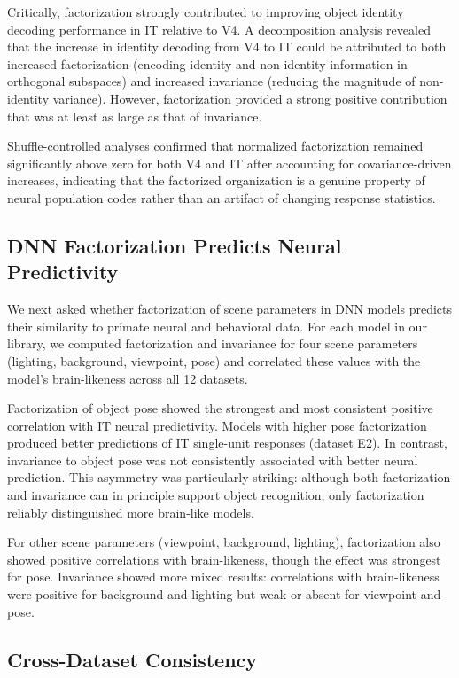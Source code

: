 \documentclass[11pt]{article}
\begin{document}
Critically, factorization strongly contributed to improving object identity decoding performance in IT relative to V4. A decomposition analysis revealed that the increase in identity decoding from V4 to IT could be attributed to both increased factorization (encoding identity and non-identity information in orthogonal subspaces) and increased invariance (reducing the magnitude of non-identity variance). However, factorization provided a strong positive contribution that was at least as large as that of invariance.

Shuffle-controlled analyses confirmed that normalized factorization remained significantly above zero for both V4 and IT after accounting for covariance-driven increases, indicating that the factorized organization is a genuine property of neural population codes rather than an artifact of changing response statistics.

\subsection{DNN Factorization Predicts Neural Predictivity}

We next asked whether factorization of scene parameters in DNN models predicts their similarity to primate neural and behavioral data. For each model in our library, we computed factorization and invariance for four scene parameters (lighting, background, viewpoint, pose) and correlated these values with the model's brain-likeness across all 12 datasets.

Factorization of object pose showed the strongest and most consistent positive correlation with IT neural predictivity. Models with higher pose factorization produced better predictions of IT single-unit responses (dataset E2). In contrast, invariance to object pose was not consistently associated with better neural prediction. This asymmetry was particularly striking: although both factorization and invariance can in principle support object recognition, only factorization reliably distinguished more brain-like models.

For other scene parameters (viewpoint, background, lighting), factorization also showed positive correlations with brain-likeness, though the effect was strongest for pose. Invariance showed more mixed results: correlations with brain-likeness were positive for background and lighting but weak or absent for viewpoint and pose.

\subsection{Cross-Dataset Consistency}
\end{document}
